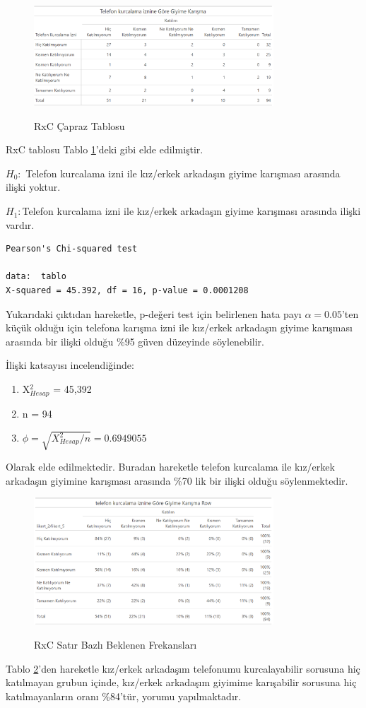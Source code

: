 \documentclass{article}
\begin{document}
\begin{figure}[htbp]
    \centering
    \caption{RxC Çapraz Tablosu}
    \includegraphics[width=0.8\textwidth]{Imgs/RxC table1.png}
    \label{rxc-table}
\end{figure}

RxC tablosu Tablo \ref{rxc-table}'deki gibi elde edilmiştir.

$H_0:$ Telefon kurcalama izni ile kız/erkek arkadaşın giyime karışması arasında ilişki yoktur.

$H_1:$Telefon kurcalama izni ile kız/erkek arkadaşın giyime karışması arasında ilişki vardır.

\begin{verbatim}
Pearson's Chi-squared test

data:  tablo
X-squared = 45.392, df = 16, p-value = 0.0001208
\end{verbatim}

Yukarıdaki çıktıdan hareketle, p-değeri test için belirlenen hata payı $\alpha=0.05$'ten küçük olduğu için telefona karışma izni ile kız/erkek arkadaşın giyime karışması arasında bir ilişki olduğu \%95 güven düzeyinde söylenebilir.

İlişki katsayısı incelendiğinde:
\begin{enumerate}
    \item X$^2_{Hesap}$ = 45,392
    \item n = 94
    \item $\phi = \sqrt{X^2_{Hesap}/n}=0.6949055$
\end{enumerate}
Olarak elde edilmektedir. Buradan hareketle telefon kurcalama ile kız/erkek arkadaşın giyimine karışması arasında \%70 lik bir ilişki olduğu söylenmektedir.

\clearpage
\begin{figure}[htbp]
    \centering
    \caption{RxC Satır Bazlı Beklenen Frekansları}
    \includegraphics[width=0.8\textwidth]{Imgs/RxC table2.png}
    \label{rxc-table2}
\end{figure}
Tablo \ref{rxc-table2}'den hareketle kız/erkek arkadaşım telefonumu kurcalayabilir sorusuna hiç katılmayan grubun içinde, kız/erkek arkadaşım giyimime karışabilir sorusuna hiç katılmayanların oranı \%84'tür, yorumu yapılmaktadır.
\end{document}
